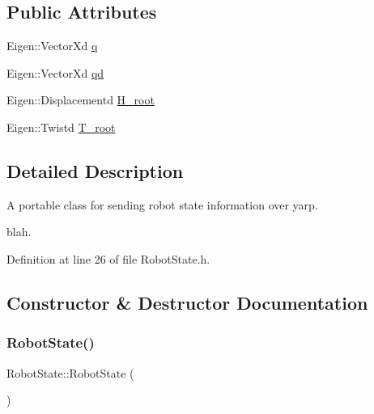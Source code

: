 \subsection*{Public Attributes}
\begin{DoxyCompactItemize}
\item 
Eigen\+::\+Vector\+Xd \hyperlink{classocra__recipes_1_1RobotState_aa442f30f43e33d4c5f5d007640d8aaa0}{q}
\item 
Eigen\+::\+Vector\+Xd \hyperlink{classocra__recipes_1_1RobotState_ac45331562cde3f3f67a9f40d71e47c6a}{qd}
\item 
Eigen\+::\+Displacementd \hyperlink{classocra__recipes_1_1RobotState_a296aaf0b3131a7d2c2a82b3b8a4cc583}{H\+\_\+root}
\item 
Eigen\+::\+Twistd \hyperlink{classocra__recipes_1_1RobotState_ae71e2d5ff8976c859921e06a4f35bf25}{T\+\_\+root}
\end{DoxyCompactItemize}


\subsection{Detailed Description}
A portable class for sending robot state information over yarp. 

blah. 

Definition at line 26 of file Robot\+State.\+h.



\subsection{Constructor \& Destructor Documentation}
\hypertarget{classocra__recipes_1_1RobotState_ad10e75019e308bb0be22aa545eab0c44}{}\label{classocra__recipes_1_1RobotState_ad10e75019e308bb0be22aa545eab0c44} 
\subsubsection{\texorpdfstring{Robot\+State()}{RobotState()}\hspace{0.1cm}{\footnotesize\ttfamily [1/2]}}
{\footnotesize\ttfamily Robot\+State\+::\+Robot\+State (\begin{DoxyParamCaption}{ }\end{DoxyParamCaption})}



